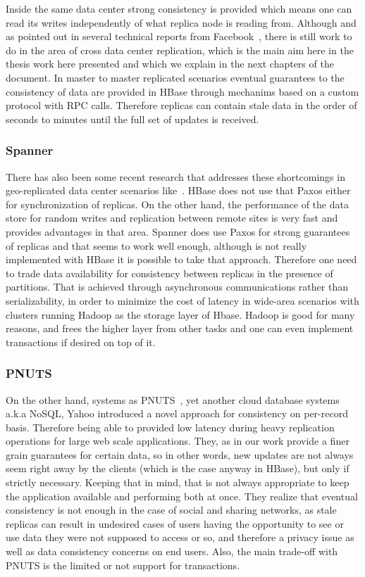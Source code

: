 Inside the same data center strong consistency is provided which means one can read its writes independently of what replica node is reading from. Although and as pointed out in several technical reports from Facebook~\cite{Aiyer:2012}, there is still work to do in the area of cross data center replication, which is the main aim here in the thesis work here presented and which we explain in the next chapters of the document. In master to master replicated scenarios eventual guarantees to the consistency of data are provided in HBase through mechanims based on a custom protocol with RPC calls. Therefore replicas can contain stale data in the order of seconds to minutes until the full set of updates is received.

\subsubsection{Spanner}

There has also been some recent research that addresses these shortcomings in geo-replicated data center scenarios like~\cite{Corbett:2012}. HBase does not use that Paxos either for synchronization of replicas. On the other hand, the performance of the data store for random writes and replication between remote sites is very fast and provides advantages in that area. Spanner does use Paxos for strong guarantees of replicas and that seems to work well enough, although is not really implemented with HBase it is possible to take that approach. Therefore one need to trade data availability for consistency between replicas in the presence of partitions. That is achieved through asynchronous communications rather than serializability, in order to minimize the cost of latency in wide-area scenarios with clusters running Hadoop as the storage layer of Hbase. Hadoop is good for many reasons, and frees the higher layer from other tasks and one can even implement transactions if desired on top of it.

\subsubsection{PNUTS}

On the other hand, systems as PNUTS~\cite{Cooper:2008}, yet another cloud database systems a.k.a NoSQL, Yahoo introduced a novel approach for consistency on per-record basis. Therefore being able to provided low latency during heavy replication operations for large web scale applications. They, as in our work provide a finer grain guarantees for certain data, so in other words, new updates are not always seem right away by the clients (which is the case anyway in HBase), but only if strictly necessary. Keeping that in mind, that is not always appropriate to keep the application available and performing both at once. They realize that eventual consistency is not enough in the case of social and sharing networks, as stale replicas can result in undesired cases of users having the opportunity to see or use data they were not supposed to access or so, and therefore a privacy issue as well as data consistency concerns on end users. Also, the main trade-off with PNUTS is the limited or not support for transactions.

